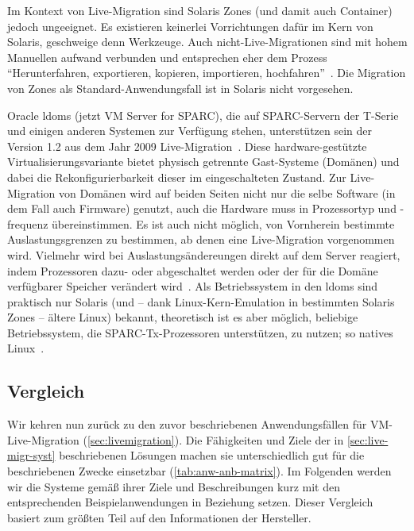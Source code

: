 Im Kontext von Live-Migration sind Solaris Zones (und damit auch
Container) jedoch ungeeignet. Es existieren keinerlei Vorrichtungen
dafür im Kern von Solaris, geschweige denn Werkzeuge. Auch
nicht-Live-Migrationen sind mit hohem Manuellen aufwand verbunden und
entsprechen eher dem Prozess "`Herunterfahren, exportieren, kopieren,
importieren, hochfahren"'~\cite{Kimchi:Solaris-Zones-m}. Die Migration
von Zones als Standard-Anwendungsfall ist in Solaris nicht vorgesehen.

Oracle \acfp{ldom} (jetzt VM Server for SPARC), die auf SPARC-Servern
der T-Serie und einigen anderen Systemen zur Verfügung stehen,
unterstützen sein der Version 1.2 aus dem Jahr 2009
Live-Migration~\cite{Laurent:Answering-a-cus}. Diese
hardware-gestützte Virtualisierungsvariante bietet physisch getrennte
Gast-Systeme (Domänen) und dabei die Rekonfigurierbarkeit dieser im
eingeschalteten Zustand. Zur Live-Migration von Domänen wird auf
beiden Seiten nicht nur die selbe Software (in dem Fall auch Firmware)
genutzt, auch die Hardware muss in Prozessortyp und -frequenz
übereinstimmen. Es ist auch nicht möglich, von Vornherein bestimmte
Auslastungsgrenzen zu bestimmen, ab denen eine Live-Migration
vorgenommen wird. Vielmehr wird bei Auslastungsändereungen direkt auf
dem Server reagiert, indem \zB Prozessoren dazu- oder abgeschaltet
werden oder der für die Domäne verfügbarer Speicher verändert
wird~\cite{2010:Oracle-VM-Serve}. Als Betriebssystem in den \acp{ldom}
sind praktisch nur Solaris (und -- dank Linux-Kern-Emulation in
bestimmten Solaris Zones -- ältere Linux) bekannt, theoretisch ist es
aber möglich, beliebige Betriebssystem, die SPARC-Tx-Prozessoren
unterstützen, zu nutzen; so \zB natives Linux~\cite{Chartre:Linux-with-LDom}.



\subsection{Vergleich}
Wir kehren nun zurück zu den zuvor beschriebenen Anwendungsfällen für
\ac{VM}-Live-Migration (\autoref{sec:livemigration}). Die Fähigkeiten
und Ziele der in \autoref{sec:live-migr-syst} beschriebenen Lösungen
machen sie unterschiedlich gut für die beschriebenen Zwecke einsetzbar
(\autoref{tab:anw-anb-matrix}). Im Folgenden werden wir die Systeme
gemäß ihrer Ziele und Beschreibungen kurz mit den entsprechenden
Beispielanwendungen in Beziehung setzen. Dieser Vergleich basiert zum
größten Teil auf den Informationen der Hersteller.

